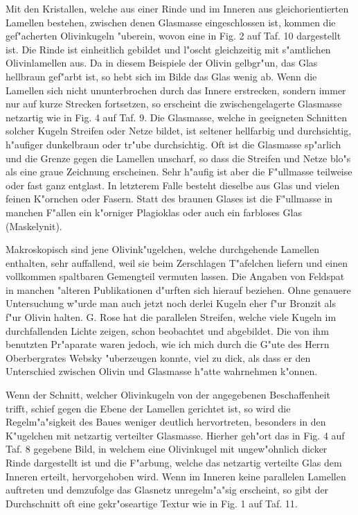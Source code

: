 \documentclass[a4paper, 11pt, oneside, polutonikogreek, german]{article}
\begin{document}
Mit den Kristallen, welche aus einer Rinde und im Inneren aus gleichorientierten Lamellen bestehen, zwischen denen Glasmasse eingeschlossen ist, kommen die gef"acherten Olivinkugeln "uberein, wovon eine in Fig. 2 auf Taf. 10 dargestellt ist. Die Rinde ist einheitlich gebildet und l"oscht gleichzeitig mit s"amtlichen Olivinlamellen aus. Da in diesem Beispiele der Olivin gelbgr"un, das Glas hellbraun gef"arbt ist, so hebt sich im Bilde das Glas wenig ab. Wenn die Lamellen sich nicht ununterbrochen durch das Innere erstrecken, sondern immer nur auf kurze Strecken fortsetzen, so erscheint die zwischengelagerte Glasmasse netzartig wie in Fig. 4 auf Taf. 9. Die Glasmasse, welche in geeigneten Schnitten solcher Kugeln Streifen oder Netze bildet, ist seltener hellfarbig und durchsichtig, h"aufiger dunkelbraun oder tr"ube durchsichtig. Oft ist die Glasmasse sp"arlich und die Grenze gegen die Lamellen unscharf, so dass die Streifen und Netze blo"s als eine graue Zeichnung erscheinen. Sehr h"aufig ist aber die F"ullmasse teilweise oder fast ganz entglast. In letzterem Falle besteht dieselbe aus Glas und vielen feinen K"ornchen oder Fasern. Statt des braunen Glases ist die F"ullmasse in manchen F"allen ein k"orniger Plagioklas oder auch ein farbloses Glas (Maskelynit).

Makroskopisch sind jene Olivink"ugelchen, welche durchgehende Lamellen enthalten, sehr auffallend, weil sie beim Zerschlagen T"afelchen liefern und einen vollkommen spaltbaren Gemengteil vermuten lassen. Die Angaben von Feldspat in manchen "alteren Publikationen d"urften sich hierauf beziehen. Ohne genauere Untersuchung w"urde man auch jetzt noch derlei Kugeln eher f"ur Bronzit als f"ur Olivin halten. G. Rose hat die parallelen Streifen, welche viele Kugeln im durchfallenden Lichte zeigen, schon beobachtet und abgebildet. Die von ihm benutzten Pr"aparate waren jedoch, wie ich mich durch die G"ute des Herrn Oberbergrates Websky "uberzeugen konnte, viel zu dick, als dass er den Unterschied zwischen Olivin und Glasmasse h"atte wahrnehmen k"onnen.

Wenn der Schnitt, welcher Olivinkugeln von der angegebenen Beschaffenheit trifft, schief gegen die Ebene der Lamellen gerichtet ist, so wird die Regelm"a"sigkeit des Baues weniger deutlich hervortreten, besonders in den K"ugelchen mit netzartig verteilter Glasmasse. Hierher geh"ort das in Fig. 4 auf Taf. 8 gegebene Bild, in welchem eine Olivinkugel mit ungew"ohnlich dicker Rinde dargestellt ist und die F"arbung, welche das netzartig verteilte Glas dem Inneren erteilt, hervorgehoben wird. Wenn im Inneren keine parallelen Lamellen auftreten und demzufolge das Glasnetz unregelm"a"sig erscheint, so gibt der Durchschnitt oft eine gekr"oseartige Textur wie in Fig. 1 auf Taf. 11.
\end{document}

